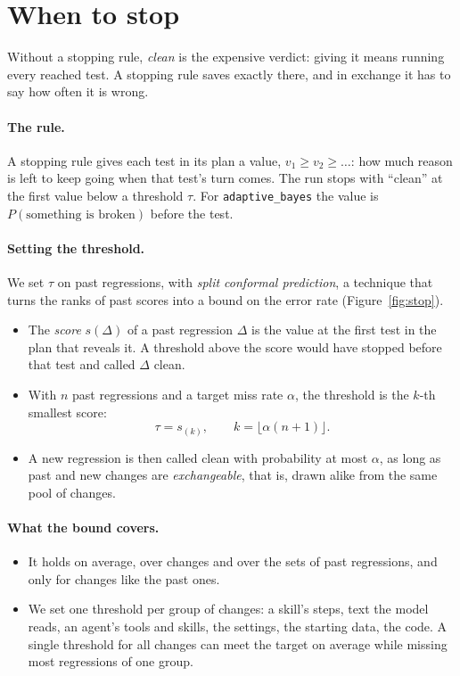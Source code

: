 \documentclass[11pt,a4paper]{article}
\newcommand{\strat}[1]{\texttt{#1}}
\begin{document}
\section{When to stop}
\label{sec:stop}

Without a stopping rule, \emph{clean} is the expensive verdict: giving it means running every reached test. A
stopping rule saves exactly there, and in exchange it has to say how often it is wrong.

\paragraph{The rule.} A stopping rule gives each test in its plan a value, $v_1 \ge v_2 \ge \dots$: how much
reason is left to keep going when that test's turn comes. The run stops with ``clean'' at the first value below a
threshold $\tau$. For \strat{adaptive\_bayes} the value is $P(\text{something is broken})$ before the test.

\paragraph{Setting the threshold.} We set $\tau$ on past regressions, with \emph{split conformal prediction}, a
technique that turns the ranks of past scores into a bound on the error rate (Figure~\ref{fig:stop}).
\begin{itemize}
  \item The \emph{score} $s(\Delta)$ of a past regression $\Delta$ is the value at the first test in the plan
        that reveals it. A threshold above the score would have stopped before that test and called $\Delta$
        clean.
  \item With $n$ past regressions and a target miss rate $\alpha$, the threshold is the $k$-th smallest score:
        \[ \tau = s_{(k)}, \qquad k = \lfloor \alpha (n + 1) \rfloor . \]
  \item A new regression is then called clean with probability at most $\alpha$, as long as past and new changes
        are \emph{exchangeable}, that is, drawn alike from the same pool of changes.
\end{itemize}

\paragraph{What the bound covers.}
\begin{itemize}
  \item It holds on average, over changes and over the sets of past regressions, and only for changes like the
        past ones.
  \item We set one threshold per group of changes: a skill's steps, text the model reads, an agent's tools and
        skills, the settings, the starting data, the code. A single threshold for all changes can meet the target
        on average while missing most regressions of one group.
\end{itemize}
\end{document}
